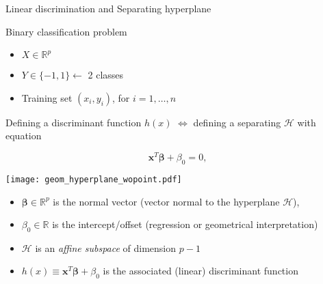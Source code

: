 \begin{frame}{Linear discrimination and Separating hyperplane}

  \begin{block}{Binary classification problem}
  \begin{itemize}
     \item $X \in \mathbb{R}^p$
     \item $Y \in \{-1,1\} \leftarrow $ 2 classes
     \item Training set $(x_i,y_i)$, for $i=1,\ldots,n$
  \end{itemize}
  \end{block}

 Defining a  discriminant function $h(x)$ 
 $\Leftrightarrow$ defining a separating  $\mathcal{H}$ with equation\\
  \begin{minipage}{.4\textwidth}
\begin{center}
                   $$
 \boldsymbol{x}^T \boldsymbol{\beta} + \beta_0 = 0, 
 $$
\end{center}
\end{minipage}
\quad
 \begin{minipage}{.3\textwidth}
  \begin{center}
   \texttt{[image: geom\_hyperplane\_wopoint.pdf]}
  \end{center}
 \end{minipage}


\begin{itemize}
 \item $\boldsymbol{\beta} \in \mathbb{R}^p$ is the normal vector (vector normal to the hyperplane $\mathcal{H}$),
 \item $\beta_0 \in \mathbb{R}$ is the intercept/offset (regression or geometrical interpretation)
 \item[\doigt] $\mathcal{H}$ is an {\em affine subspace} of dimension $p-1$
 \item[\doigt] $h(x)\equiv \boldsymbol{x}^T \boldsymbol{\beta} + \beta_0$ is the associated (linear) discriminant function
\end{itemize}

 
\end{frame}





